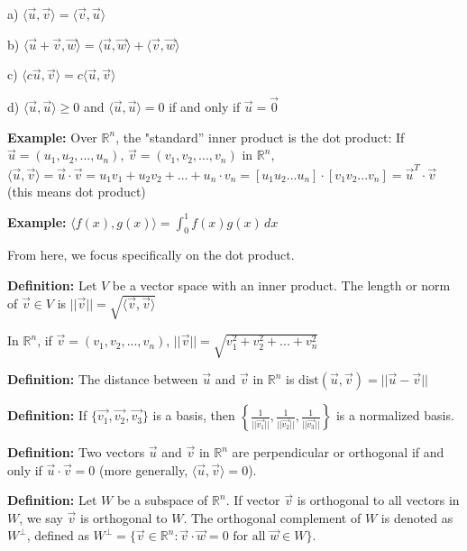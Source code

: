 \documentclass{article}
\begin{document}
a) \( \langle \vec{u}, \vec{v} \rangle = \langle \vec{v}, \vec{u} \rangle \)

b) \( \langle \vec{u}+\vec{v}, \vec{w} \rangle = \langle \vec{u}, \vec{w} \rangle+ \langle \vec{v}, \vec{w} \rangle \)

c) \( \langle c\vec{u}, \vec{v} \rangle = c \langle \vec{u}, \vec{v} \rangle \)

d) \( \langle \vec{u}, \vec{u} \rangle \geq 0 \) and \( \langle \vec{u}, \vec{u} \rangle = 0 \) if and only if \( \vec{u} = \vec{0} \)

\textbf{Example:} Over \( \mathbb{R}^n \), the "standard'' inner product is the dot product: If \( \vec{u} = (u_1, u_2, ..., u_n) \), \( \vec{v} = (v_1, v_2, ..., v_n) \) in \( \mathbb{R}^n \), \( \langle \vec{u}, \vec{v} \rangle = \vec{u} \cdot \vec{v} = u_1v_1+u_2v_2+...+u_n \cdot v_n = [u_1 u_2 ... u_n] \cdot [v_1 v_2 ... v_n] = \vec{u}^T \cdot \vec{v} \) (this means dot product)

\textbf{Example:} \( \langle f(x), g(x) \rangle = \int_{0}^{1} f(x)g(x) \, dx \)

From here, we focus specifically on the dot product.

\textbf{Definition:} Let \( V \) be a vector space with an inner product. The length or norm of \( \vec{v} \in V \) is \( ||\vec{v}|| = \sqrt{\langle \vec{v}, \vec{v} \rangle} \)

In \( \mathbb{R}^n \), if \( \vec{v} = (v_1, v_2, ..., v_n) \), \( ||\vec{v}|| = \sqrt{v_1^2+v_2^2+...+v_n^2} \) 

\textbf{Definition:} The distance between \( \vec{u} \) and \( \vec{v} \) in \( \mathbb{R}^n \) is \( \text{dist}(\vec{u}, \vec{v}) = ||\vec{u}-\vec{v}|| \)

\textbf{Definition:} If \( \{\vec{v_1}, \vec{v_2}, \vec{v_3}\} \) is a basis, then \( \left\{ \frac{1}{||\vec{v_1}||}, \frac{1}{||\vec{v_2}||}, \frac{1}{||\vec{v_3}||} \right\} \) is a normalized basis.

\textbf{Definition:} Two vectors \( \vec{u} \) and \( \vec{v} \) in \( \mathbb{R}^n \) are perpendicular or orthogonal if and only if \( \vec{u} \cdot \vec{v} = 0 \) (more generally, \( \langle \vec{u}, \vec{v} \rangle = 0 \)).

\textbf{Definition:} Let \( W \) be a subspace of \( \mathbb{R}^n \). If vector \( \vec{v} \) is orthogonal to all vectors in \( W \), we say \( \vec{v} \) is orthogonal to \( W \). The orthogonal complement of \( W \) is denoted as \( W^{\perp} \), defined as \( W^{\perp} = \{ \vec{v} \in \mathbb{R}^n : \vec{v} \cdot \vec{w} = 0 \text{ for all } \vec{w} \in W \} \).
\end{document}
